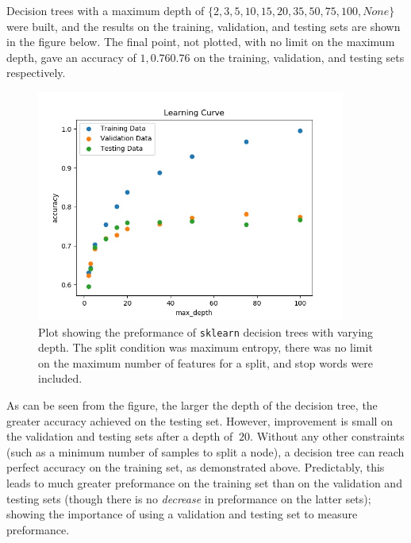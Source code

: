 \documentclass{article}
\begin{document}
   Decision trees with a maximum depth of $\{ 2, 3, 5, 10, 15, 20, 35, 50, 75, 100, None \}$ were built, and
   the results on the training, validation, and testing sets are shown in the figure below. The final point,
   not plotted, with no limit on the maximum depth, gave an accuracy of $1, 0.76 0.76$ on the training,
   validation, and testing sets respectively.
      \begin{figure}[h] \centering
         \includegraphics[width=4in]{resources/part7/part7a_splitCondition=entropy_maxFeatures=None_stopWords=True}

         \caption{Plot showing the preformance of \texttt{sklearn} decision trees with
            varying depth. The split condition was maximum entropy, there was no limit on the maximum
            number of features for a split, and stop words were included.}
      \end{figure}
   As can be seen from the figure, the larger the depth of the decision tree, the greater accuracy achieved on
   the testing set. However, improvement is small on the validation and testing sets after a depth of
   $~20$. Without any other constraints (such as a minimum number of samples to split a node), a decision tree
   can reach perfect accuracy on the training set, as demonstrated above. Predictably, this leads to
   much greater preformance on the training set than on the validation and testing sets (though there is no
   \textit{decrease} in preformance on the latter sets); showing the importance of using a validation and testing
   set to measure preformance.
\end{document}
